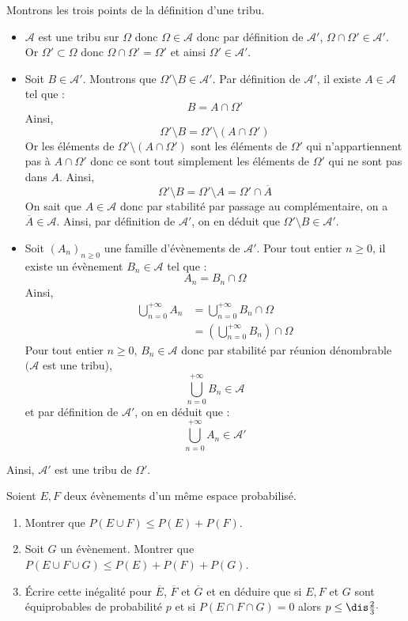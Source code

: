 \documentclass[a4paper,10pt]{report}
\begin{document}
\corr Montrons les trois points de la définition d'une tribu.

\begin{itemize}
\item $\mathcal{A}$ est une tribu sur $\Omega$ donc $\Omega \in \mathcal{A}$ donc par définition de $\mathcal{A}'$, $ \Omega \cap \Omega' \in \mathcal{A}'$. Or $\Omega' \subset \Omega$ donc $ \Omega \cap \Omega' = \Omega'$ et ainsi $\Omega' \in \mathcal{A}'$.
\item Soit $B \in \mathcal{A}'$. Montrons que $\Omega' \setminus B \in \mathcal{A}'$. Par définition de $\mathcal{A}'$, il existe $A \in \mathcal{A}$ tel que :
$$ B = A \cap \Omega'$$
Ainsi,
$$ \Omega' \setminus B  = \Omega' \setminus  (A \cap \Omega') $$
Or les éléments de $\Omega' \setminus  (A \cap \Omega')$ sont les éléments de $\Omega'$ qui n'appartiennent pas à $A \cap \Omega'$ donc ce sont tout simplement les éléments de $\Omega'$ qui ne sont pas dans $A$. Ainsi,
$$  \Omega' \setminus B = \Omega' \setminus A = \Omega' \cap \overline{A}$$
On sait que $A \in \mathcal{A}$ donc par stabilité par passage au complémentaire, on a $\overline{A} \in \mathcal{A}$. Ainsi, par définition de $\mathcal{A}'$, on en déduit que $\Omega' \setminus B \in \mathcal{A}'$.
\item Soit $(A_n)_{n \geq 0}$ une famille d'évènements de $\mathcal{A}'$. Pour tout entier $n \geq 0$, il existe un évènement $B_n \in \mathcal{A}$ tel que :
$$ A_n = B_n \cap \Omega$$
Ainsi,
\begin{align*}
\bigcup_{n=0}^{+ \infty} A_n & = \bigcup_{n=0}^{+ \infty}B_n \cap \Omega \\
& = \left( \bigcup_{n=0}^{+ \infty}B_n \right) \cap \Omega
\end{align*}
Pour tout entier $n \geq 0$, $B_n \in \mathcal{A}$ donc par stabilité par réunion dénombrable $(\mathcal{A}$ est une tribu),
$$  \bigcup_{n=0}^{+ \infty}B_n \in \mathcal{A}$$
et par définition de $\mathcal{A}'$, on en déduit que :
$$ \bigcup_{n=0}^{+ \infty} A_n \in \mathcal{A}'$$
\end{itemize}
Ainsi, $\mathcal{A}'$ est une tribu de $\Omega'$.

\begin{Exa}  Soient $E,F$ deux évènements d'un même espace probabilisé.
\begin{enumerate}
\item Montrer que $P(E \cup F) \leq P(E) + P(F)$.
\item Soit $G$ un évènement. Montrer que $P(E \cup F \cup G) \leq P(E) + P(F) + P(G)$.
\item Écrire cette inégalité pour $\overline{E}$, $\overline{F}$ et $\overline{G}$ et en déduire que si $E,F$ et $G$ sont équiprobables de probabilité $p$ et si $P(E \cap F \cap G)=0$ alors $p \leq \dis \frac{2}{3} \cdot$
\end{enumerate}
\end{Exa}
\end{document}
